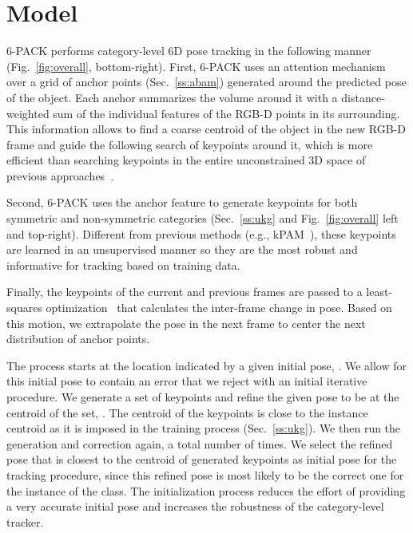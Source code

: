 \documentclass[letterpaper, 10 pt, conference]{ieeeconf}
\newcommand{\methodname}{\textsc{6-PACK}\xspace}
\begin{document}
\section{Model}
\label{s:mod}

\methodname{} performs category-level 6D pose tracking in the following manner (Fig.~\ref{fig:overall}, bottom-right). {First}, \methodname{} uses an attention mechanism over a grid of anchor points (Sec.~\ref{ss:abam}) generated around the predicted pose of the object. Each anchor summarizes the volume around it with a distance-weighted sum of the individual features of the RGB-D points in its surrounding. This information allows to find a coarse centroid of the object in the new RGB-D frame and guide the following search of keypoints around it, which is more efficient than searching keypoints in the entire unconstrained 3D space of previous approaches~\cite{suwajanakorn2018discovery}. 

{Second}, \methodname{} uses the anchor feature to generate keypoints for both symmetric and non-symmetric categories (Sec.~\ref{ss:ukg} and Fig.~\ref{fig:overall} left and top-right). Different from previous methods (e.g., kPAM~\cite{manuelli2019kpam}), these keypoints are learned in an unsupervised manner so they are the most robust and informative for tracking based on training data.

{Finally}, the keypoints of the current and previous frames are passed to a least-squares optimization~\cite{arun1987least} that calculates the inter-frame change in pose. Based on this motion, we extrapolate the pose in the next frame to center the next distribution of anchor points.

The process starts at the location indicated by a given initial pose, . We allow for this initial pose to contain an error that we reject with an initial iterative procedure. We generate a set of keypoints and refine the given pose to be at the centroid of the set, . The centroid of the keypoints is close to the instance centroid as it is imposed in the training process (Sec.~\ref{ss:ukg}). We then run the generation and correction again, a total number of  times. We select the refined pose that is closest to the centroid of generated keypoints as initial pose for the tracking procedure, since this refined pose is most likely to be the correct one for the instance of the class. The initialization process reduces the effort of providing a very accurate initial pose  and increases the robustness of the category-level tracker.
\end{document}

